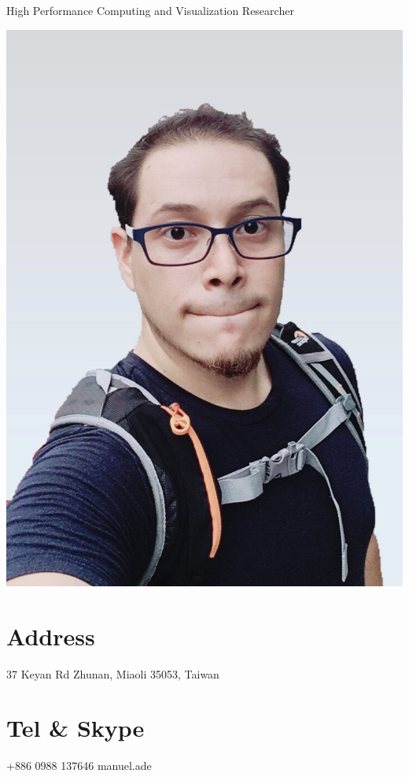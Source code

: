 \documentclass[a4paper]{friggeri-cv}
\begin{document}
      {\hspace{4.0cm} High Performance Computing and Visualization Researcher}
      

\begin{aside}
  \includegraphics[trim={1cm 5cm 1cm 5cm},clip,scale=0.12]{img/CVPhoto2017.jpg}
  \section{Address}
    37 Keyan Rd
    Zhunan, Miaoli
    35053, Taiwan
    ~
  \section{Tel \& Skype}
    +886 0988 137646
    manuel.ade
    ~

\end{aside}
\end{document}
